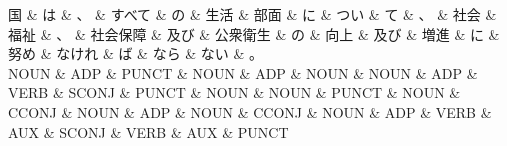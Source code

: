 \documentclass[tikz,border=5pt]{standalone}
\begin{document}
\normalsize
\begin{dependency}[edge unit distance=11.4pt]
    \begin{deptext}[column sep=1em]
        国 \& は \& 、 \& すべて \& の \& 生活 \& 部面 \& に \& つい \& て \& 、 \& 社会 \& 福祉 \& 、 \& 社会保障 \& 及び \& 公衆衛生 \& の \& 向上 \& 及び \& 増進 \& に \& 努め \& なけれ \& ば \& なら \& ない \& 。\\
        NOUN \& ADP \& PUNCT \& NOUN \& ADP \& NOUN \& NOUN \& ADP \& VERB \& SCONJ \& PUNCT \& NOUN \& NOUN \& PUNCT \& NOUN \& CCONJ \& NOUN \& ADP \& NOUN \& CCONJ \& NOUN \& ADP \& VERB \& AUX \& SCONJ \& VERB \& AUX \& PUNCT\\
    \end{deptext}
\end{dependency}
\end{document}
